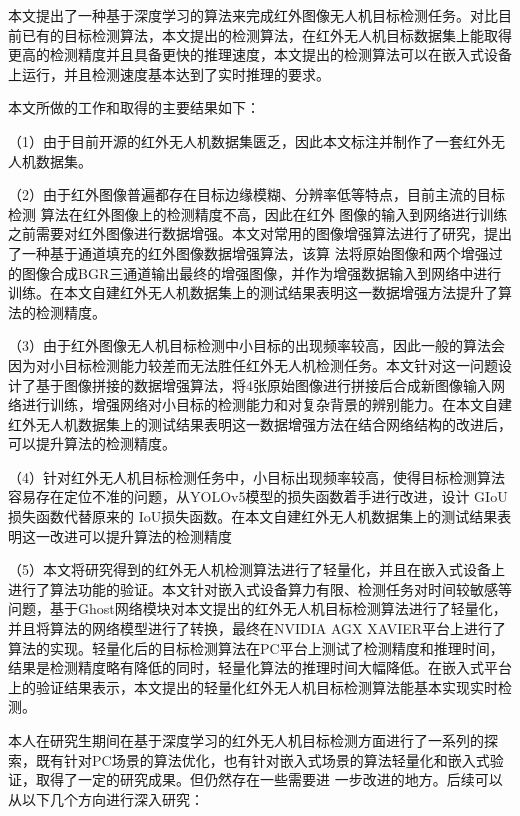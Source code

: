 \begin{conclusions}

本文提出了一种基于深度学习的算法来完成红外图像无人机目标检测任务。对比目前已有的目标检测算法，本文提出的检测算法，在红外无人机目标数据集上能取得更高的检测精度并且具备更快的推理速度，本文提出的检测算法可以在嵌入式设备上运行，并且检测速度基本达到了实时推理的要求。

本文所做的工作和取得的主要结果如下：

（1）由于目前开源的红外无人机数据集匮乏，因此本文标注并制作了一套红外无人机数据集。

（2）由于红外图像普遍都存在目标边缘模糊、分辨率低等特点，目前主流的目标检测
算法在红外图像上的检测精度不高，因此在红外
图像的输入到网络进行训练之前需要对红外图像进行数据增强。本文对常用的图像增强算法进行了研究，提出了一种基于通道填充的红外图像数据增强算法，该算
法将原始图像和两个增强过的图像合成BGR三通道输出最终的增强图像，并作为增强数据输入到网络中进行训练。在本文自建红外无人机数据集上的测试结果表明这一数据增强方法提升了算法的检测精度。

（3）由于红外图像无人机目标检测中小目标的出现频率较高，因此一般的算法会因为对小目标检测能力较差而无法胜任红外无人机检测任务。本文针对这一问题设计了基于图像拼接的数据增强算法，将4张原始图像进行拼接后合成新图像输入网络进行训练，增强网络对小目标的检测能力和对复杂背景的辨别能力。在本文自建红外无人机数据集上的测试结果表明这一数据增强方法在结合网络结构的改进后，可以提升算法的检测精度。

（4）针对红外无人机目标检测任务中，小目标出现频率较高，使得目标检测算法容易存在定位不准的问题，从YOLOv5模型的损失函数着手进行改进，设计 GIoU 损失函数代替原来的
IoU损失函数。在本文自建红外无人机数据集上的测试结果表明这一改进可以提升算法的检测精度


（5）本文将研究得到的红外无人机检测算法进行了轻量化，并且在嵌入式设备上进行了算法功能的验证。本文针对嵌入式设备算力有限、检测任务对时间较敏感等问题，基于Ghost网络模块对本文提出的红外无人机目标检测算法进行了轻量化，并且将算法的网络模型进行了转换，最终在NVIDIA AGX XAVIER平台上进行了算法的实现。轻量化后的目标检测算法在PC平台上测试了检测精度和推理时间，结果是检测精度略有降低的同时，轻量化算法的推理时间大幅降低。在嵌入式平台上的验证结果表示，本文提出的轻量化红外无人机目标检测算法能基本实现实时检测。

本人在研究生期间在基于深度学习的红外无人机目标检测方面进行了一系列的探
索，既有针对PC场景的算法优化，也有针对嵌入式场景的算法轻量化和嵌入式验证，取得了一定的研究成果。但仍然存在一些需要进
一步改进的地方。后续可以从以下几个方向进行深入研究：


\end{conclusions}

